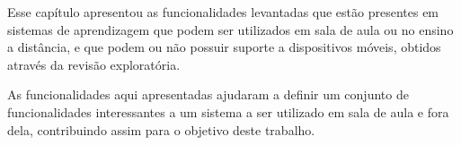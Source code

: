 Esse capítulo apresentou as funcionalidades levantadas que estão presentes em sistemas de aprendizagem que podem ser utilizados em sala de aula ou no ensino a distância, e que podem ou não possuir suporte a dispositivos móveis, obtidos através da revisão exploratória.

As funcionalidades aqui apresentadas ajudaram a definir um conjunto de funcionalidades interessantes a um sistema a ser utilizado em sala de aula e fora dela, contribuindo assim para o objetivo deste trabalho.